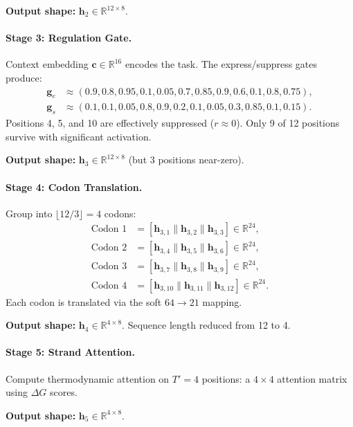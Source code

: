 \begin{example}
\textbf{Output shape:} $\mathbf{h}_2 \in \mathbb{R}^{12 \times 8}$.

\paragraph{Stage 3: Regulation Gate.}
Context embedding $\mathbf{c} \in \mathbb{R}^{16}$ encodes the task. The express/suppress gates produce:
\begin{align*}
\mathbf{g}_e &\approx (0.9, 0.8, 0.95, 0.1, 0.05, 0.7, 0.85, 0.9, 0.6, 0.1, 0.8, 0.75), \\
\mathbf{g}_s &\approx (0.1, 0.1, 0.05, 0.8, 0.9, 0.2, 0.1, 0.05, 0.3, 0.85, 0.1, 0.15).
\end{align*}
Positions 4, 5, and 10 are effectively suppressed ($r \approx 0$). Only 9 of 12 positions survive with significant activation.

\textbf{Output shape:} $\mathbf{h}_3 \in \mathbb{R}^{12 \times 8}$ (but 3 positions near-zero).

\paragraph{Stage 4: Codon Translation.}
Group into $\lfloor 12/3 \rfloor = 4$ codons:
\begin{align*}
\text{Codon 1} &= [\mathbf{h}_{3,1} \| \mathbf{h}_{3,2} \| \mathbf{h}_{3,3}] \in \mathbb{R}^{24}, \\
\text{Codon 2} &= [\mathbf{h}_{3,4} \| \mathbf{h}_{3,5} \| \mathbf{h}_{3,6}] \in \mathbb{R}^{24}, \\
\text{Codon 3} &= [\mathbf{h}_{3,7} \| \mathbf{h}_{3,8} \| \mathbf{h}_{3,9}] \in \mathbb{R}^{24}, \\
\text{Codon 4} &= [\mathbf{h}_{3,10} \| \mathbf{h}_{3,11} \| \mathbf{h}_{3,12}] \in \mathbb{R}^{24}.
\end{align*}
Each codon is translated via the soft $64 \to 21$ mapping.

\textbf{Output shape:} $\mathbf{h}_4 \in \mathbb{R}^{4 \times 8}$. Sequence length reduced from 12 to 4.

\paragraph{Stage 5: Strand Attention.}
Compute thermodynamic attention on $T' = 4$ positions: a $4 \times 4$ attention matrix using $\Delta G$ scores.

\textbf{Output shape:} $\mathbf{h}_5 \in \mathbb{R}^{4 \times 8}$.


\end{example}
